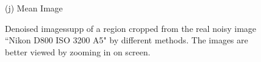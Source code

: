 \documentclass[10pt,onecolumn,letterpaper]{article}
\begin{document}
\begin{figure}[H]
{\begin{minipage}[t]{0.196\textwidth}
{\footnotesize (j) Mean Image \cite{crosschannel2016} }
\end{minipage}
}
\caption{Denoised imagessupp of a region cropped from the real noisy image ``Nikon D800 ISO 3200 A5" \cite{crosschannel2016} by different methods. The images are better viewed by zooming in on screen.} 
\label{fig20}
\end{figure}


{\small


}
\end{document}
